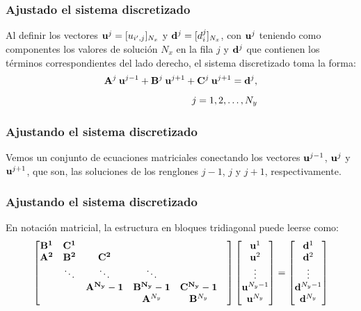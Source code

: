 \documentclass[12pt]{beamer}
\begin{document}
\begin{frame}
\frametitle{Ajustado el sistema discretizado}
Al definir los vectores $\vb{u}^{j} = [u_{i^{\prime}, j}]_{N_{x}}$ y $\vb{d}^{j} = [d_{i}^{j}]_{N_{x}}$, con $\vb{u}^{j}$ teniendo como componentes los valores de solución $N_{x}$ en la fila $j$ y $\vb{d}^{j}$ que contienen los términos correspondientes del lado derecho, el sistema discretizado toma la forma:
\pause
\begin{align}
\vb{A}^{j} \: \vb{u}^{j-1} + \vb{B}^{j} \: \vb{u}^{j+1} + \vb{C}^{j} \: \vb{u}^{j+1} = \vb{d}^{j}, \\[0.5em]
j = 1, 2, \ldots, N_{y} \nonumber
\label{eq:ecuacion_13_17}
\end{align}
\end{frame}
\begin{frame}
\frametitle{Ajustando el sistema discretizado}
Vemos un conjunto de ecuaciones matriciales conectando los vectores $\vb{u}^{j-1}$, $\vb{u}^{j}$ y $\vb{u}^{j+1}$, que son, las soluciones de los renglones $j-1$, $j$ y $j+1$, respectivamente.
\end{frame}
\begin{frame}
\frametitle{Ajustando el sistema discretizado}
En notación matricial, la estructura en bloques tridiagonal puede leerse como:
\pause
\fontsize{10}{10}\selectfont
\begin{align}
\begin{bmatrix}
\vb{B^{1}} & \vb{C^{1}} & & & \\
\vb{A^{2}} & \vb{B^{2}} & \vb{C^{2}} & & \\
    & \ddots & \ddots & \ddots & \\
    & & \vb{A^{N_{y}}-1} & \vb{B^{N_{y}}-1} & \vb{C^{N_{y}}-1}& \\
    & & & \vb{A}^{N_{y}} & \vb{B}^{N_{y}} 
\end{bmatrix}
\begin{bmatrix}
\vb{u}^{1} \\
\vb{u}^{2} \\
\vdots \\
\vb{u}^{N_{y} - 1} \\
\vb{u}^{N_{y}}
\end{bmatrix} = 
\begin{bmatrix}
\vb{d}^{1} \\
\vb{d}^{2} \\
\vdots \\
\vb{d}^{N_{y} - 1} \\
\vb{d}^{N_{y}}
\end{bmatrix}
\label{eq:ecuacion_13_18}
\end{align}
\end{frame}
\end{document}
